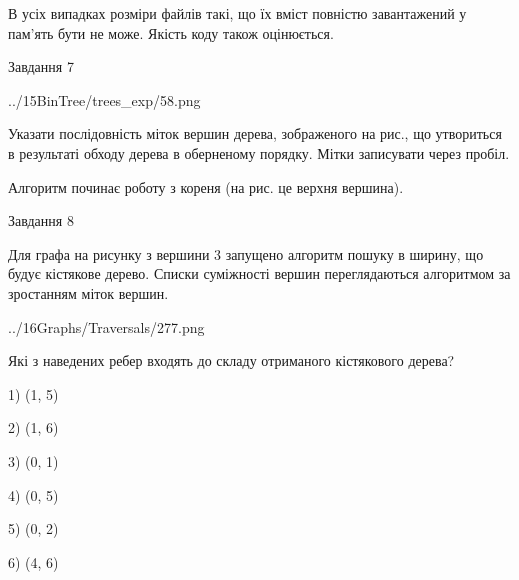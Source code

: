 \documentclass[12pt, ukrainian]{article}
\begin{document}
{В усіх випадках розміри файлів такі, що їх вміст повністю завантажений у пам'ять бути не може. Якість коду також оцінюється.



\vspace{10mm}\par

\newpage
\begin{minipage}[t]{9.7cm}
               
{\begin{center}Завдання {7}\end{center}}
\vspace{-4mm}

\begin{center}
	{../15BinTree/trees_exp/58.png}
\end{center}
Указати послідовність міток вершин дерева, зображеного на рис., що утвориться в результаті обходу дерева в оберненому порядку. Мітки записувати через пробіл.\par Алгоритм починає роботу з кореня (на рис. це верхня вершина).\par

\end{minipage}
\vline \hspace{8mm}
\begin{minipage}[t]{8.0cm}
               
{\begin{center}Завдання {8}\end{center}}
\vspace{-4mm}
Для графа на рисунку з вершини 3 запущено алгоритм пошуку в ширину, що будує кістякове дерево. Списки суміжності вершин переглядаються алгоритмом за зростанням міток вершин.\par
\begin{center}
	{../16Graphs/Traversals/277.png}
\end{center}
\par Які з наведених ребер входять до складу отриманого кістякового дерева?\par
1) (1, 5)\par
2) (1, 6)\par
3) (0, 1)\par
4) (0, 5)\par
5) (0, 2)\par
6) (4, 6)\par
{\vskip 15pt} \par


\end{minipage}}
\end{document}

